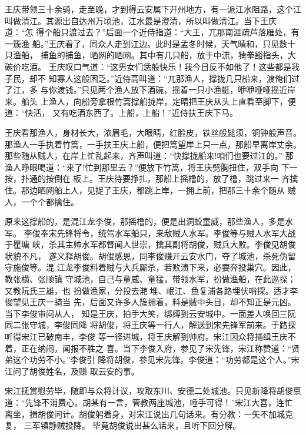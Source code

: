 王庆带领三十余骑，走至晚，才到得云安属下开州地方，有一派江水阻路，这个江
叫做清江。其源出自达州万顷池，江水最是澄清，所以叫做清江。当下王庆道：“怎
得个船只渡过去？”后面一个近侍指道：“大王，兀那南涯疏芦落雁处，有一簇渔
船。”王庆看了，同众人走到江边。此时是孟冬时候，天气晴和，只见数十只渔船，
捕鱼的捕鱼，晒网的晒网。其中有几只船，放于中流，猜拳豁指头，大碗价吃酒。
王庆叹口气道：“这男女们恁般快乐！我今日反不如他了！这些都是我子民，却不
知寡人这般困乏。”近侍高叫道：“兀那渔人，撑拢几只船来，渡俺们过了江，多
与你渡钱。”只见两个渔人放下酒碗，摇着一只小渔艇，咿咿哑哑摇近岸来。船头
上渔人，向船旁拿根竹篙撑船拢岸，定睛把王庆从头上直看至脚下，便道：“快活，
又有吃酒东西了。上船，上船！”近侍扶王庆下马。

王庆看那渔人，身材长大，浓眉毛，大眼睛，红脸皮，铁丝般髭须，铜钟般声音。
那渔人一手执着竹篙，一手扶王庆上船，便把篙望岸上只一点，那船早离岸丈余。
那些随从贼人，在岸上忙乱起来，齐声叫道：“快撑拢船来!咱们也要过江的。”
那渔人睁眼喝道：“来了!忙到那里去？”便放下竹篙，将王庆劈胸扭住，双手向
下一按，扑通的按倒在板上。王庆待要挣扎，那船上摇橹的，放了橹，跳过来一
齐擒住。那边晒网船上人，见捉了王庆，都跳上岸，一拥上前，把那三十余个随从
贼人，一个个都擒住。

原来这撑船的，是混江龙李俊，那摇橹的，便是出洞蛟童威，那些渔人，多是水军。
李俊奉宋先锋将令，统驾水军船只，来敌贼人水军。李俊等与贼人水军大战于瞿塘
峡，杀其主帅水军都督闻人世崇，擒其副将胡俊，贼兵大败。李俊见胡俊状貌不凡，
遂义释胡俊。胡俊感恩，同李俊赚开云安水门，夺了城池，杀死伪留守施俊等。混
江龙李俊料着贼与大兵厮杀，若败溃下来，必要奔投巢穴。因此，教张横、张顺镇
守城池，自己与童威、童猛，带领水军，扮做渔船，在此巡探；又教阮氏三雄，也
扮做渔家，分投去滟堆、岷江、鱼复浦各路埋伏哨探。适才李俊望见王庆一骑当
先，后面又许多人簇拥着，料是贼中头目，却不知正是元凶。当下李俊审问从人，
知是王庆，拍手大笑，绑缚到云安城中。一面差人唤回三阮同二张守城，李俊同降
将胡俊，将王庆等一行人，解送到宋先锋军前来。于路探听得宋江已破南丰，李俊
等一径进城，将王庆解到帅府。宋江因众将捕缉王庆不着，正在纳闷，闻报不胜之
喜。当下李俊入府，参见了宋先锋，宋江称赞道：“贤弟这个功劳不小。”李俊引
降将胡俊，参见宋先锋。李俊道：“功劳都是这个人。”宋江问了胡俊姓名，及赚
取云安的事。

宋江抚赏慰劳毕，随即与众将计议，攻取东川、安德二处城池。只见新降将胡俊禀
道：“先锋不消费心。胡某有一言，管教两座城池，唾手可得！”宋江大喜，连忙
离坐，揖胡俊问计。胡俊躬着身，对宋江说出几句话来。有分教：一矢不加城克复，
三军镇静贼投降。
毕竟胡俊说出甚么话来，且听下回分解。